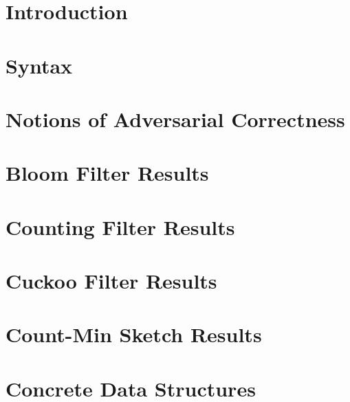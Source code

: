 \section{Introduction}


\section{Syntax}
\label{sec:syntax}


\section{Notions of Adversarial Correctness}
\label{sec:correctness}


\section{Bloom Filter Results}
\label{sec:bloom}


\section{Counting Filter Results}
\label{sec:counting}


\section{Cuckoo Filter Results}
\label{cuckoo}


\section{Count-Min Sketch Results}
\label{cms}


\section{Concrete Data Structures}
\label{sec:structures}


%

